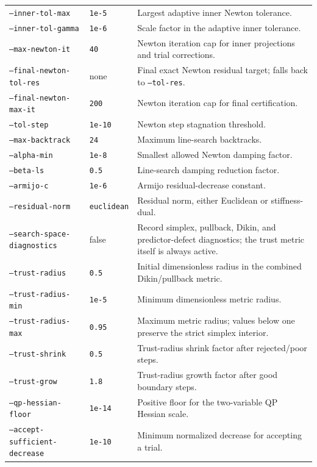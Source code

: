 \documentclass[11pt]{article}
\begin{document}
\begin{longtable}{>{\raggedright\arraybackslash}p{}
                  >{\raggedright\arraybackslash}p{}
                  >{\raggedright\arraybackslash}p{}}
\texttt{--inner-tol-max} & \texttt{1e-5} & Largest adaptive inner Newton tolerance. \\
\texttt{--inner-tol-gamma} & \texttt{1e-6} & Scale factor in the adaptive inner tolerance. \\
\texttt{--max-newton-it} & \texttt{40} & Newton iteration cap for inner projections and trial corrections. \\
\texttt{--final-newton-tol-res} & none & Final exact Newton residual target; falls back to \texttt{--tol-res}. \\
\texttt{--final-newton-max-it} & \texttt{200} & Newton iteration cap for final certification. \\
\texttt{--tol-step} & \texttt{1e-10} & Newton step stagnation threshold. \\
\texttt{--max-backtrack} & \texttt{24} & Maximum line-search backtracks. \\
\texttt{--alpha-min} & \texttt{1e-8} & Smallest allowed Newton damping factor. \\
\texttt{--beta-ls} & \texttt{0.5} & Line-search damping reduction factor. \\
\texttt{--armijo-c} & \texttt{1e-6} & Armijo residual-decrease constant. \\
\texttt{--residual-norm} & \texttt{euclidean} & Residual norm, either Euclidean or stiffness-dual. \\
\texttt{--search-space-diagnostics} & false & Record simplex, pullback, Dikin, and predictor-defect diagnostics; the trust metric itself is always active. \\
\texttt{--trust-radius} & \texttt{0.5} & Initial dimensionless radius in the combined Dikin/pullback metric. \\
\texttt{--trust-radius-min} & \texttt{1e-5} & Minimum dimensionless metric radius. \\
\texttt{--trust-radius-max} & \texttt{0.95} & Maximum metric radius; values below one preserve the strict simplex interior. \\
\texttt{--trust-shrink} & \texttt{0.5} & Trust-radius shrink factor after rejected/poor steps. \\
\texttt{--trust-grow} & \texttt{1.8} & Trust-radius growth factor after good boundary steps. \\
\texttt{--qp-hessian-floor} & \texttt{1e-14} & Positive floor for the two-variable QP Hessian scale. \\
\texttt{--accept-sufficient-decrease} & \texttt{1e-10} & Minimum normalized decrease for accepting a trial. \\

\end{longtable}
\end{document}
